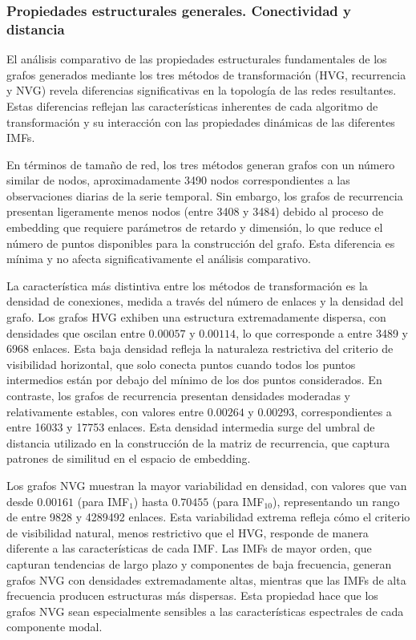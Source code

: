 \documentclass[11pt,a4paper]{article}
\begin{document}
\subsubsection{Propiedades estructurales generales. Conectividad y distancia}

El análisis comparativo de las propiedades estructurales fundamentales de los grafos generados mediante los tres métodos de transformación (HVG, recurrencia y NVG) revela diferencias significativas en la topología de las redes resultantes. Estas diferencias reflejan las características inherentes de cada algoritmo de transformación y su interacción con las propiedades dinámicas de las diferentes IMFs.

En términos de tamaño de red, los tres métodos generan grafos con un número similar de nodos, aproximadamente 3490 nodos correspondientes a las observaciones diarias de la serie temporal. Sin embargo, los grafos de recurrencia presentan ligeramente menos nodos (entre 3408 y 3484) debido al proceso de embedding que requiere parámetros de retardo y dimensión, lo que reduce el número de puntos disponibles para la construcción del grafo. Esta diferencia es mínima y no afecta significativamente el análisis comparativo.

La característica más distintiva entre los métodos de transformación es la densidad de conexiones, medida a través del número de enlaces y la densidad del grafo. Los grafos HVG exhiben una estructura extremadamente dispersa, con densidades que oscilan entre $0.00057$ y $0.00114$, lo que corresponde a entre 3489 y 6968 enlaces. Esta baja densidad refleja la naturaleza restrictiva del criterio de visibilidad horizontal, que solo conecta puntos cuando todos los puntos intermedios están por debajo del mínimo de los dos puntos considerados. En contraste, los grafos de recurrencia presentan densidades moderadas y relativamente estables, con valores entre $0.00264$ y $0.00293$, correspondientes a entre 16033 y 17753 enlaces. Esta densidad intermedia surge del umbral de distancia utilizado en la construcción de la matriz de recurrencia, que captura patrones de similitud en el espacio de embedding.

Los grafos NVG muestran la mayor variabilidad en densidad, con valores que van desde $0.00161$ (para IMF$_1$) hasta $0.70455$ (para IMF$_{10}$), representando un rango de entre 9828 y 4289492 enlaces. Esta variabilidad extrema refleja cómo el criterio de visibilidad natural, menos restrictivo que el HVG, responde de manera diferente a las características de cada IMF. Las IMFs de mayor orden, que capturan tendencias de largo plazo y componentes de baja frecuencia, generan grafos NVG con densidades extremadamente altas, mientras que las IMFs de alta frecuencia producen estructuras más dispersas. Esta propiedad hace que los grafos NVG sean especialmente sensibles a las características espectrales de cada componente modal.
\end{document}
